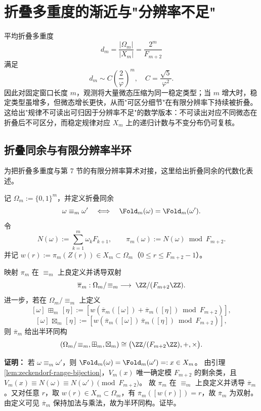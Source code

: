 \section{折叠多重度的渐近与"分辨率不足"}\label{app:fold-multiplicity}

平均折叠多重度
\[
d_m=\frac{|\Omega_m|}{|X_m|}=\frac{2^m}{F_{m+2}}
\]
满足
\[
d_m\sim C\left(\frac{2}{\varphi}\right)^m,\quad C=\frac{\sqrt5}{\varphi^2}.
\]
因此对固定窗口长度 $m$，观测将大量微态压缩为同一稳定类型；当 $m$ 增大时，稳定类型虽增多，但微态增长更快，从而"可区分细节"在有限分辨率下持续被折叠。这给出"规律不可读出可归因于分辨率不足"的数学版本：不可读出对应不同微态在折叠后不可区分，而稳定规律对应 $X_m$ 上的递归计数与不变分布仍可复核。

\subsection{折叠同余与有限分辨率半环}
为把折叠多重度与第 7 节的有限分辨率算术对接，这里给出折叠同余的代数化表述。

\begin{definition}[折叠同余与值模映射]
记 $\Omega_m:=\{0,1\}^m$，并定义折叠同余
\[
\omega\equiv_m\omega'\quad\Longleftrightarrow\quad\Fold_m(\omega)=\Fold_m(\omega').
\]
令
\[
N(\omega):=\sum_{k=1}^m \omega_k F_{k+1},
\qquad
\pi_m(\omega):=N(\omega)\bmod F_{m+2}.
\]
并记 $w(r):=\pi_m(Z(r))\in X_m\subset\Omega_m$（$0\le r\le F_{m+2}-1$）。
\end{definition}

\begin{theorem}[折叠同余的模半环表示]
\label{thm:fold-congruence-mod-semirings}
映射 $\pi_m$ 在 $\equiv_m$ 上良定义并诱导双射
\[
\overline\pi_m:\Omega_m/\!\equiv_m\;\longrightarrow\;\ZZ/(F_{m+2}\ZZ).
\]
进一步，若在 $\Omega_m/\!\equiv_m$ 上定义
\[
[\omega]\,\boxplus_m\,[\eta]:=[w(\overline\pi_m([\omega])\!+\!\overline\pi_m([\eta])\bmod F_{m+2})],
\]
\[
[\omega]\,\boxtimes_m\,[\eta]:=[w(\overline\pi_m([\omega])\,\overline\pi_m([\eta])\bmod F_{m+2})],
\]
则 $\overline\pi_m$ 给出半环同构
\[
(\Omega_m/\!\equiv_m,\boxplus_m,\boxtimes_m)\cong\bigl(\ZZ/(F_{m+2}\ZZ),+,\times\bigr).
\]
\end{theorem}

\textbf{证明：}
若 $\omega\equiv_m\omega'$，则 $\Fold_m(\omega)=\Fold_m(\omega')=:x\in X_m$。
由引理 \ref{lem:zeckendorf-range-bijection}，$V_m(x)$ 唯一确定模 $F_{m+2}$ 的剩余类，且
\(V_m(x)\equiv N(\omega)\equiv N(\omega')\pmod{F_{m+2}}\)。
故 $\pi_m$ 在 $\equiv_m$ 上良定义并诱导 $\overline\pi_m$。又对任意 $r$，取 $w(r)\in X_m\subset\Omega_m$，有
\(\overline\pi_m([w(r)])=r\)，故 $\overline\pi_m$ 为双射。由定义可见 $\overline\pi_m$ 保持加法与乘法，故为半环同构。证毕。

